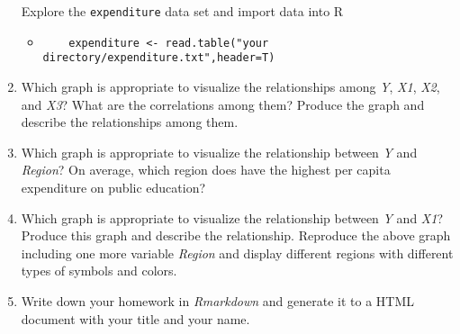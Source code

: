 \documentclass{article}\usepackage[]{graphicx}\usepackage[]{color}
\newcommand{\hlstd}[1]{\textcolor[rgb]{0.345,0.345,0.345}{#1}}%
\renewcommand{\hlstd}[1]{\textcolor[rgb]{0.387,0.581,0.148}{\texttt{#1}}}%
\begin{document}
\begin{enumerate}
Explore the \hlstd{expenditure} data set and import data into R

\begin{itemize}
  \item[]
 \begin{verbatim}
    expenditure <- read.table("your directory/expenditure.txt",header=T)
    \end{verbatim}
\end{itemize}

\item
Which graph is appropriate to visualize the relationships among \emph{Y}, \emph{X1}, \emph{X2}, and \emph{X3}? What are the correlations among them? Produce the graph and describe the relationships among them.

\item
Which graph is appropriate to visualize the relationship between \emph{Y} and \emph{Region}? On average, which region does have the highest per capita expenditure on public education?

\item
Which graph is appropriate to visualize the relationship between  \emph{Y} and \emph{X1}? Produce this graph and describe the relationship.  Reproduce the above graph including one more variable \emph{Region} and display different regions with different types of symbols and colors.


\item 
Write down your homework in \emph{Rmarkdown} and generate it to a HTML document with your title and your name.

\end{enumerate}
\end{document}
